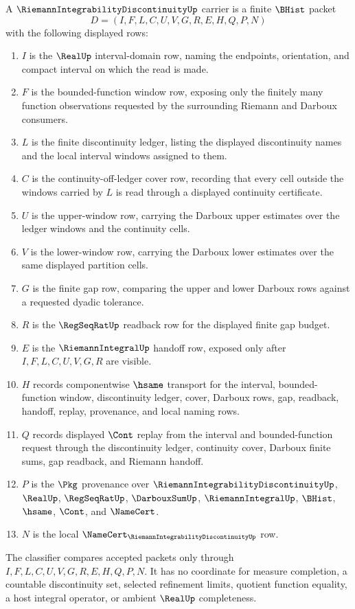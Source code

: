 \begin{definition}
\label{def:riemann-integrability-discontinuity-carrier}
A $\RiemannIntegrabilityDiscontinuityUp$ carrier is a finite $\BHist$ packet
$$
D=(I,F,L,C,U,V,G,R,E,H,Q,P,N)
$$
with the following displayed rows:
\begin{enumerate}
\item $I$ is the $\RealUp$ interval-domain row, naming the endpoints, orientation, and compact interval on which the read is made.
\item $F$ is the bounded-function window row, exposing only the finitely many function observations requested by the surrounding Riemann and Darboux consumers.
\item $L$ is the finite discontinuity ledger, listing the displayed discontinuity names and the local interval windows assigned to them.
\item $C$ is the continuity-off-ledger cover row, recording that every cell outside the windows carried by $L$ is read through a displayed continuity certificate.
\item $U$ is the upper-window row, carrying the Darboux upper estimates over the ledger windows and the continuity cells.
\item $V$ is the lower-window row, carrying the Darboux lower estimates over the same displayed partition cells.
\item $G$ is the finite gap row, comparing the upper and lower Darboux rows against a requested dyadic tolerance.
\item $R$ is the $\RegSeqRatUp$ readback row for the displayed finite gap budget.
\item $E$ is the $\RiemannIntegralUp$ handoff row, exposed only after $I,F,L,C,U,V,G,R$ are visible.
\item $H$ records componentwise $\hsame$ transport for the interval, bounded-function window, discontinuity ledger, cover, Darboux rows, gap, readback, handoff, replay, provenance, and local naming rows.
\item $Q$ records displayed $\Cont$ replay from the interval and bounded-function request through the discontinuity ledger, continuity cover, Darboux finite sums, gap readback, and Riemann handoff.
\item $P$ is the $\Pkg$ provenance over $\RiemannIntegrabilityDiscontinuityUp$, $\RealUp$, $\RegSeqRatUp$, $\DarbouxSumUp$, $\RiemannIntegralUp$, $\BHist$, $\hsame$, $\Cont$, and $\NameCert$.
\item $N$ is the local $\NameCert_{\RiemannIntegrabilityDiscontinuityUp}$ row.
\end{enumerate}
The classifier compares accepted packets only through $I,F,L,C,U,V,G,R,E,H,Q,P,N$. It has no coordinate for measure completion, a countable discontinuity set, selected refinement limits, quotient function equality, a host integral operator, or ambient $\RealUp$ completeness.
\end{definition}

